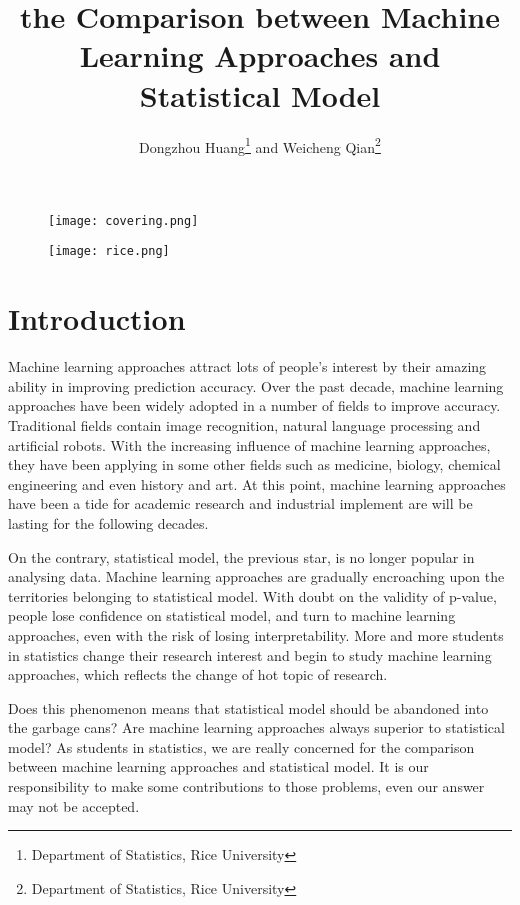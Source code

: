 \documentclass[12pt]{article}
\title{the Comparison between Machine Learning Approaches and Statistical Model}
\author{Dongzhou Huang\footnote{Department of Statistics, Rice University} and Weicheng Qian\footnote{Department of Statistics, Rice University}}
\begin{document}
\maketitle

\begin{figure}[!htb]
\centering
\texttt{[image: covering.png]}
\end{figure}



\begin{figure}[!htb]
\centering
\texttt{[image: rice.png]}
\end{figure}


\newpage


\section{Introduction}
Machine learning approaches attract lots of people's interest by their amazing ability in improving prediction accuracy. Over the past decade, machine learning approaches have been widely adopted in a number of fields to improve accuracy. Traditional fields contain image recognition, natural language processing and artificial robots. With the increasing influence of machine learning approaches, they have been applying in some other fields such as medicine, biology, chemical engineering and even history and art. At this point, machine learning approaches have been a tide for academic research and industrial implement are will be lasting for the following decades.

On the contrary, statistical model, the previous star, is no longer popular in analysing data. Machine learning approaches are gradually encroaching upon the territories belonging to statistical model. With doubt on the validity of p-value, people lose confidence on statistical model, and turn to machine learning approaches, even with the risk of losing interpretability. More and more students in statistics change their research interest and begin to study machine learning approaches, which reflects the change of hot topic of research.

Does this phenomenon means that statistical model should be abandoned into the garbage cans? Are machine learning approaches always superior to statistical model? As students in statistics, we are really concerned for the comparison between machine learning approaches and statistical model. It is our responsibility to make some contributions to those problems, even our answer may not be accepted.
\end{document}
